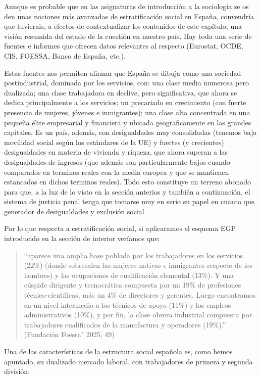 \documentclass[
  spanish,
  letterpaper,
  DIV=11,
  numbers=noendperiod]{scrreprt}
\begin{document}
Aunque es probable que en las asignaturas de introducción a la
sociología se os den unas nociones más avanzadas de estratificación
social en España, convendría que tuvierais, a efectos de contextualizar
los contenidos de este capítulo, una visión resumida del estado de la
cuestión en nuestro país. Hay toda una serie de fuentes e informes que
ofrecen datos relevantes al respecto (Eurostat, OCDE, CIS, FOESSA, Banco
de España, etc.).

Estas fuentes nos permiten afirmar que España se dibuja como una
sociedad postindustrial, dominada por los servicios, con: una clase
media numerosa pero dualizada; una clase trabajadora en declive, pero
significativa, que ahora se dedica principalmente a los servicios; un
precariado en crecimiento (con fuerte presencia de mujeres, jóvenes e
inmigrantes); una clase alta concentrada en una pequeña élite
empresarial y financiera y ubicada geograficamente en las grandes
capitales. Es un país, además, con desigualdades muy consolidadas
(tenemos baja movilidad social según los estándares de la UE) y fuertes
(y crecientes) desigualdades en materia de vivienda y riqueza, que ahora
superan a las desigualdades de ingresos (que además son particularmente
bajos cuando comparados en terminos reales con la media europea y que se
mantienen estancados en dichos terminos reales). Todo esto constituye un
terreno abonado para que, a la luz de lo visto en la sección anterios y
también a continuación, el sistema de justicia penal tenga que tomarse
muy en serio su papel en cuanto que generador de desigualdades y
exclusión social.

Por lo que respecta a estratificación social, si aplicaramos el esquema
EGP introducido en la sección de interior veríamos que:

\begin{quote}
``aparece una amplia base poblada por los trabajadores en los servicios
(22\%) (donde sobresalen las mujeres nativas e inmigrantes respecto de
los hombres) y las ocupaciones de cualificación elemental (13\%). Y una
cúspide dirigente y tecnocrática compuesta por un 19\% de profesiones
técnico-científicas, más un 4\% de directores y gerentes. Luego
encontramos en un nivel intermedio a los técnicos de apoyo (11\%) y los
empleos administrativos (10\%), y por fin, la clase obrera industrial
compuesta por trabajadores cualificados de la manufactura y operadores
(19\%).'' (Fundación Foessa" 2025, 49)
\end{quote}

Una de las características de la estructura social española es, como
hemos apuntado, su dualizado mercado laboral, con trabajadores de
primera y segunda división:
\end{document}
